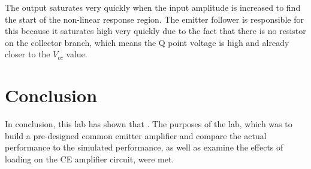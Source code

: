 \documentclass[12pt,letterpaper]{report}
\begin{document}
The output saturates very quickly when the input amplitude is increased to find the start of the non-linear response region. The emitter follower is responsible for this because it saturates high very quickly due to the fact that there is no resistor on the collector branch, which means the Q point voltage is high and already closer to the $V_{cc}$ value.

\section*{Conclusion}

In conclusion, this lab has shown that 
. The purposes of the lab, which was to build a pre-designed common emitter amplifier and compare the actual performance to the simulated performance, as well as  examine the effects of loading on the CE amplifier circuit, were met.
\end{document}
